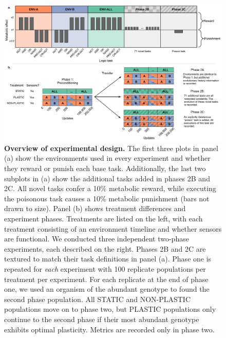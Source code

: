 \begin{figure}[ht!]
    \centering
    \includegraphics[width=1\textwidth]{chapters/03-evolutionary-consequences-of-plasticity/media/experimental-design.pdf}
    \caption{\small
    \textbf{Overview of experimental design.}
    The first three plots in panel (a) show the environments used in every experiment and whether they reward or punish each base task. 
    Additionally, the last two subplots in (a) show the additional tasks added in phases 2B and 2C. 
    All novel tasks confer a 10\% metabolic reward, while executing the poisonous task causes a 10\% metabolic punishment (bars not drawn to size). 
    Panel (b) shows treatment differences and experiment phases. 
    Treatments are listed on the left, with each treatment consisting of an environment timeline and whether sensors are functional. 
    We conducted three independent two-phase experiments, each described on the right.
    Phases 2B and 2C are textured to match their task definitions in panel (a). 
    Phase one is repeated for \textit{each} experiment with 100 replicate populations per treatment per experiment. 
    For each replicate at the end of phase one, we used an organism of the abundant genotype to found the second phase population. 
    All STATIC and NON-PLASTIC populations move on to phase two, but PLASTIC populations only continue to the second phase if their most abundant genotype exhibits optimal plasticity. 
    Metrics are recorded only in phase two. 
    }
    \label{chapter:consequences-of-plasticity:fig:experimental-design}
\end{figure}